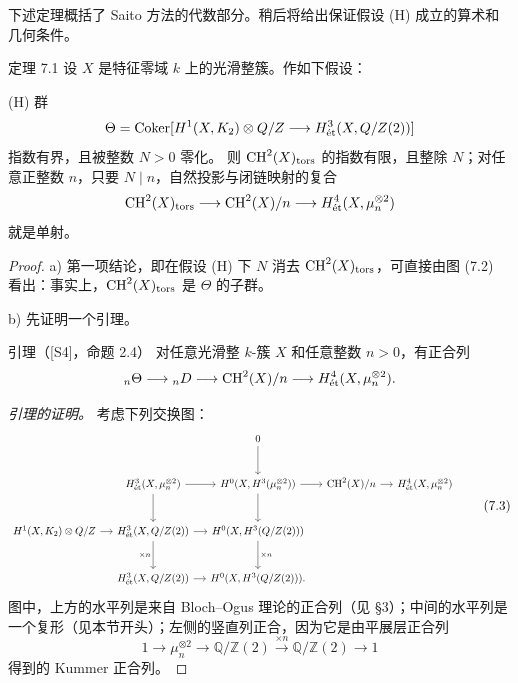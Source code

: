 下述定理概括了 Saito 方法的代数部分。稍后将给出保证假设 (H) 成立的算术和几何条件。
\begin{statement}{定理 7.1}
设 $X$ 是特征零域 $k$ 上的光滑整簇。作如下假设：

\noindent (H) 群
\[
 \Theta=\operatorname{Coker}[H^1(X,K_2)\otimes Q/Z
        \longrightarrow H^3_{\mathrm{\acute et}}(X,Q/Z(2))]
\]
指数有界，且被整数 $N>0$ 零化。
则 $\operatorname{CH}^2(X)_{\mathrm{tors}}$ 的指数有限，且整除 $N$；对任意正整数 $n$，只要 $N\mid n$，自然投影与闭链映射的复合
\[
 \operatorname{CH}^2(X)_{\mathrm{tors}}\longrightarrow\operatorname{CH}^2(X)/n
 \longrightarrow H^4_{\mathrm{\acute et}}(X,\mu_n^{\otimes2})
\]
就是单射。
\end{statement}
\begin{proof}
a) 第一项结论，即在假设 (H) 下 $N$ 消去 $\operatorname{CH}^2(X)_{\mathrm{tors}}$，可直接由图 (7.2) 看出：事实上，$\operatorname{CH}^2(X)_{\mathrm{tors}}$ 是 $\Theta$ 的子群。

b) 先证明一个引理。
\begin{statement}{引理（[S4]，命题 2.4）}
对任意光滑整 $k$-簇 $X$ 和任意整数 $n>0$，有正合列
\[
 {}_n\Theta\longrightarrow {}_nD\longrightarrow\operatorname{CH}^2(X)/n
 \longrightarrow H^4_{\mathrm{\acute et}}(X,\mu_n^{\otimes2}).
\]
\end{statement}
\noindent\textit{引理的证明。} 考虑下列交换图：
\begin{equation*}
\resizebox{.98\linewidth}{!}{$
\begin{tikzcd}[ampersand replacement=\&,column sep=small,row sep=large]
 \&\&0\arrow[d]\\
 \&H^3_{\et}(X,\mu_n^{\otimes2})\arrow[r]\arrow[d]
 \&H^0(X,\mathcal H^3(\mu_n^{\otimes2}))\arrow[r]\arrow[d]
 \&\CH^2(X)/n\arrow[r]\&H^4_{\et}(X,\mu_n^{\otimes2})\\
 H^1(X,\mathcal K_2)\otimes\mathbb Q/\mathbb Z\arrow[r]
 \&H^3_{\et}(X,\mathbb Q/\mathbb Z(2))\arrow[r]\arrow[d,"{\times n}"']
 \&H^0(X,\mathcal H^3(\mathbb Q/\mathbb Z(2)))\arrow[d,"{\times n}"]\\
 \&H^3_{\et}(X,\mathbb Q/\mathbb Z(2))\arrow[r]
 \&H^0(X,\mathcal H^3(\mathbb Q/\mathbb Z(2))).
\end{tikzcd}$}
\tag{7.3}
\end{equation*}
图中，上方的水平列是来自 Bloch--Ogus 理论的正合列（见 §3）；中间的水平列是一个复形（见本节开头）；左侧的竖直列正合，因为它是由平展层正合列
\[
 1\longrightarrow\mu_n^{\otimes2}\longrightarrow\mathbb Q/\mathbb Z(2)
 \xrightarrow{\times n}\mathbb Q/\mathbb Z(2)\longrightarrow1
\]
得到的 Kummer 正合列。


\end{proof}
